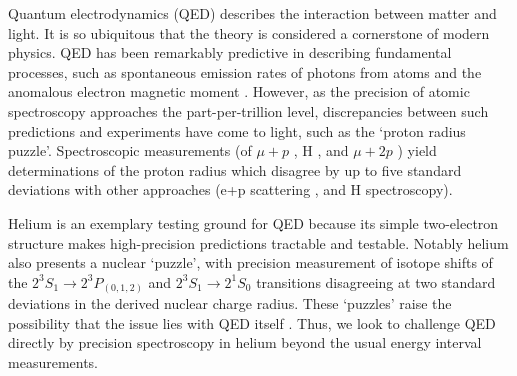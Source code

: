 \documentclass[12pt]{article}
\newcommand{\MetastableState}{2^{3\!}S_1}%
\newcommand{\UpperStateManifold}{3^{3\!}P}%
\newcommand{\LowerStates}{2^{3\!}P_{(0,1,2)}}%
\newcommand{\LowerStateManifold}{2^{3\!}P}%
\newcommand{\SingletState}{2^{1\!}S_0}%
\begin{document}



Quantum electrodynamics (QED) describes the interaction between matter and light. It is so ubiquitous that the theory is considered a cornerstone of modern physics.
QED has been remarkably predictive in describing fundamental processes, such as spontaneous emission rates of photons from atoms and the anomalous electron magnetic moment \cite{PhysRevD.91.033006}.
However, as the precision of atomic spectroscopy approaches the part-per-trillion level, discrepancies between such predictions and experiments have come to light, such as the `proton radius puzzle'. Spectroscopic measurements (of $\mu+p$ \cite{Pohl2010}, H \cite{Bezginov1007,Beyer79}, and $\mu +2p$ \cite{Pohl669}) yield determinations of the proton radius which disagree by up to five standard deviations with other approaches (e+p scattering \cite{ZHAN201159}, and H spectroscopy\cite{PhysRevLett.120.183001}). 


Helium is an exemplary testing ground for QED because its simple two-electron structure makes high-precision predictions tractable and testable. Notably helium also presents a nuclear `puzzle', with precision measurement of isotope shifts of the \(\MetastableState \rightarrow \LowerStates \) \cite{PhysRevLett.119.263002} and \(\MetastableState \rightarrow \SingletState \) \cite{Rengelink2018} transitions disagreeing at two standard deviations in the derived nuclear charge radius. These `puzzles' raise the possibility that the issue lies with QED itself \cite{refId0}. Thus, we look to challenge QED directly by precision spectroscopy in helium beyond the usual energy interval measurements.
\end{document}
